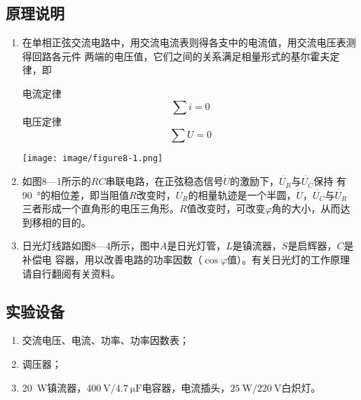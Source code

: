 \documentclass[UTF8]{article}
\begin{document}
        \subsection{原理说明}
            \begin{enumerate}
                \item 在单相正弦交流电路中，用交流电流表则得各支中的电流值，用交流电压表测得回路各元件
                两端的电压值，它们之间的关系满足相量形式的基尔霍夫定律，即
                \begin{adjustwidth}{0em}{0em}
                    \begin{minipage}[H]{0.45\textwidth}
                        电流定律
                        \begin{equation*}
                           \sum i = 0
                        \end{equation*}
                        电压定律
                        \begin{equation*}
                            \sum \dot{U} = 0
                        \end{equation*}
                    \end{minipage}
                    \begin{minipage}[H]{0.45\textwidth}
                        \centering
                        \texttt{[image: image/figure8-1.png]}
                    \end{minipage}
                \end{adjustwidth}
                \item 如图8—1所示的$RC$串联电路，在正弦稳态信号$\dot{U}$的激励下，$\dot{U_R}$与$\dot{U_C}$保持
                有\SI{90}{\degree}的相位差，即当阻值$R$改变时，$\dot{U_R}$的相量轨迹是一个半圆，$\dot{U}$，$\dot{U_C}$与$\dot{U_R}$
                三者形成一个直角形的电压三角形。$R$值改变时，可改变$\varphi$角的大小，从而达到移相的目的。 
                \item 日光灯线路如图8—4所示，图中$A$是日光灯管，$L$是镇流器，$S$是启辉器，$C$是补偿电
                容器，用以改善电路的功率因数（$\cos \varphi$值）。有关日光灯的工作原理请自行翻阅有关资料。
            \end{enumerate}
        \subsection{实验设备}
            \begin{enumerate}[label=\textbf{\arabic*}.]
                \item 交流电压、电流、功率、功率因数表； 
                \item 调压器； 
                \item \SI{20}{\watt}镇流器，$\SI{400}{\volt} / \SI{4.7}{\micro\farad}$电容器，电流插头，$\SI{25}{\watt} / \SI{220}{\volt}$白炽灯。 
            \end{enumerate}
\end{document}
